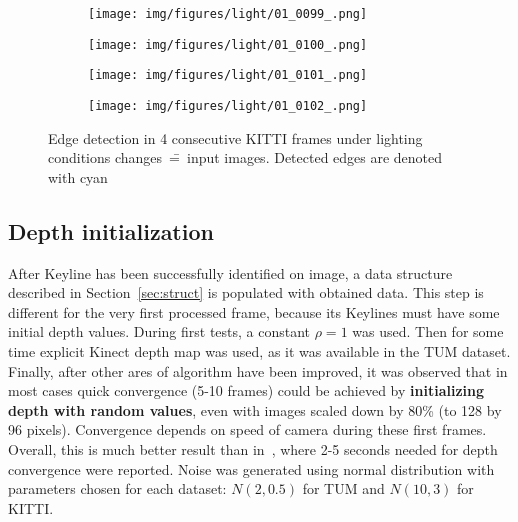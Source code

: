 \begin{figure}[hp]
	\centering
	\begin{subfigure}{1\textwidth}
		\centering
		\centering\texttt{[image: img/figures/light/01\_0099\_.png]}
		\subcaption{\label{fig:light2_a}}
	\end{subfigure}
	\begin{subfigure}{1\textwidth}
		\centering
		\centering\texttt{[image: img/figures/light/01\_0100\_.png]}
		\subcaption{\label{fig:light2_b}}
	\end{subfigure}
	\begin{subfigure}{1\textwidth}
		\centering
		\centering\texttt{[image: img/figures/light/01\_0101\_.png]}
		\subcaption{\label{fig:light2_c}}
	\end{subfigure}
	\begin{subfigure}{1\textwidth}
		\centering
		\centering\texttt{[image: img/figures/light/01\_0102\_.png]}
		\subcaption{\label{fig:light2_d}}
	\end{subfigure}
	
	\caption{\label{fig:light2}Edge detection in 4 consecutive KITTI \cite{kitti} frames under lighting conditions changes~\==~input images. Detected edges are denoted with cyan}
\end{figure}



\subsection{Depth initialization}

After Keyline has been successfully identified on image, a data structure described in Section~\ref{sec:struct} is populated with obtained data. This step is different for the very first processed frame, because its Keylines must have some initial depth values. During first tests, a constant $\rho = 1$ was used. Then for some time explicit Kinect depth map was used, as it was available in the TUM dataset. Finally, after other ares of algorithm have been improved, it was observed that in most cases quick convergence (5-10 frames) could be achieved by \textbf{initializing depth with random values}, even with images scaled down by 80\% (to 128 by 96 pixels). Convergence depends on speed of camera during these first frames. Overall, this is much better result than in~\cite{jose2015realtime}, where 2-5 seconds needed for depth convergence were reported. Noise was generated using normal distribution with parameters chosen for each dataset: $N(2,0.5)$ for TUM and $N(10,3)$ for KITTI.


